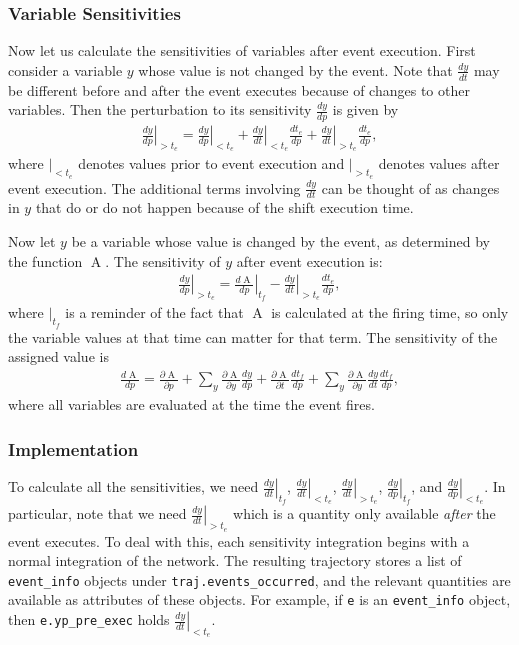 \documentclass[12pt]{article}
\makeatletter
\newcommand{\py}[1]{\lstinline[language=Python, showstringspaces=False]@#1@}
\newcommand{\assignment}{\ensuremath{\operatorname{A}}\xspace}
\makeatother
\begin{document}
\subsubsection{Variable Sensitivities}
Now let us calculate the sensitivities of variables after event execution.
First consider a variable $y$ whose value is not changed by the event.
Note that $\frac{dy}{dt}$ may be different before and after the event executes because of changes to other variables.
Then the perturbation to its sensitivity $\frac{dy}{dp}$ is given by
\begin{align}
\left.\frac{dy}{dp}\right|_{> t_e} = \left.\frac{dy}{dp}\right|_{< t_e} + \left.\frac{dy}{dt}\right|_{< t_e} \frac{d t_e}{dp} + \left.\frac{dy}{dt}\right|_{> t_e} \frac{d t_e}{dp},
\end{align}
where $|_{< t_e}$ denotes values prior to event execution and $|_{> t_e}$ denotes values after event execution. 
The additional terms involving $\frac{dy}{dt}$ can be thought of as changes in $y$ that do or do not happen because of the shift execution time.

Now let $y$ be a variable whose value is changed by the event, as determined by the function \assignment.
The sensitivity of $y$ after event execution is:
\begin{align}
\left.\frac{dy}{dp}\right|_{> t_e} =
 \left.\frac{d \assignment}{dp}\right|_{t_f} 
 - \left.\frac{dy}{dt}\right|_{> t_e} \frac{d t_e}{dp},
\end{align}
where $|_{t_f}$ is a reminder of the fact that \assignment is calculated at the firing time, so only the variable values at that time can matter for that term.
The sensitivity of the assigned value is
\begin{align}
\frac{d \assignment}{dp} = 
\frac{\partial \assignment}{\partial p} 
+ \sum_y \frac{\partial \assignment}{\partial y} \frac{dy}{dp} 
+ \frac{\partial \assignment}{\partial t} \frac{d t_f}{dp} 
+ \sum_y \frac{\partial \assignment}{\partial y} \frac{dy}{dt}\frac{d t_f}{dp},
\end{align}
where all variables are evaluated at the time the event fires.

\subsubsection{Implementation}
To calculate all the sensitivities, we need $\left.\frac{dy}{dt}\right|_{t_f}$, $\left.\frac{dy}{dt}\right|_{< t_e}$, $\left.\frac{dy}{dt}\right|_{> t_e}$, $\left.\frac{dy}{dp}\right|_{t_f}$, and $\left.\frac{dy}{dp}\right|_{< t_e}$.
In particular, note that we need $\left.\frac{dy}{dt}\right|_{> t_e}$ which is a quantity only available \emph{after} the event executes.
To deal with this, each sensitivity integration begins with a normal integration of the network.
The resulting trajectory stores a list of \py{event_info} objects under \py{traj.events_occurred}, and the relevant quantities are available as attributes of these objects.
For example, if \py{e} is an \py{event_info} object, then \py{e.yp_pre_exec} holds $\left.\frac{dy}{dt}\right|_{< t_e}$.
\end{document}
